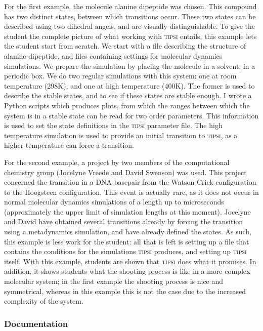 \documentclass[]{article}
\begin{document}
For the first example, the molecule alanine dipeptide was chosen. This compound has two distinct states, between which transitions occur. These two states can be described using two dihedral angels, and are visually distinguishable. To give the student the complete picture of what working with \textsc{tipsi} entails, this example lets the student start from scratch. We start with a file describing the structure of alanine dipeptide, and files containing settings for molecular dynamics simulations. We prepare the simulation by placing the molecule in a solvent, in a periodic box. We do two regular simulations with this system: one at room temperature (298K), and one at high temperature (400K). The former is used to describe the stable states, and to see if these states are stable enough. I wrote a Python scripts which produces plots, from which the ranges between which the system is in a stable state can be read for two order parameters. This information is used to set the state definitions in the \textsc{tipsi} parameter file. The high temperature simulation is used to provide an initial transition to \textsc{tipsi}, as a higher temperature can force a transition.

For the second example, a project by two members of the computational chemistry group (Jocelyne Vreede and David Swenson) was used. This project concerned the transition in a DNA basepair from the Watson-Crick configuration to the Hoogsteen configuration. This event is actually rare, as it does not occur in normal molecular dynamics simulations of a length up to microseconds (approximately the upper limit of simulation lengths at this moment). Jocelyne and David have obtained several transitions already by forcing the transition using a metadynamics simulation, and have already defined the states. As such, this example is less work for the student: all that is left is setting up a file that contains the conditions for the simulations \textsc{tipsi} produces, and setting up \textsc{tipsi} itself. With this example, students are shown that \textsc{tipsi} does what it promises. In addition, it shows students what the shooting process is like in a more complex molecular system; in the first example the shooting process is nice and symmetrical, whereas in this example this is not the case due to the increased complexity of the system.

\subsubsection*{Documentation}
\end{document}
